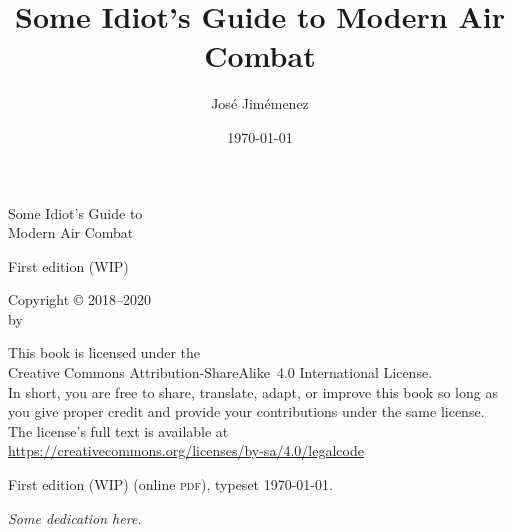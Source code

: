 \documentclass[fontsize=10bp, numbers=endperiod, draft=true]{scrbook}
\title{Some Idiot's Guide to Modern Air Combat}
\author{José Jimémenez}
\date{\today}
\makeatletter
\newcommand{\edition}{First edition \acronym{(WIP)}}
\newcommand{\acronym}[1]{\textsc{#1}}
\newcommand{\https}[1]{\url{https://#1}}
\let\runauthor\@author
\renewcommand{\cleardoublepage}{\clearpage}
\makeatother
\begin{document}
\fontsize{10bp}{13bp}\selectfont

\frontmatter
\setcounter{secnumdepth}{0}
\setlength\parindent{0pt}

{}
\vspace*{1in}
\begin{center}
\sffamily
\fontsize{0.25in}{0.3in}\selectfont
Some Idiot's Guide to \\
\fontsize{0.5in}{0.6in}\selectfont
Modern Air Combat

\normalsize
\vspace{1.5\baselineskip}
\edition
\vspace{2in}

\LARGE
\runauthor
\end{center}
\clearpage

{\raggedright%
\null
\vfill

Copyright © 2018--2020 \\
by \runauthor
\bigskip

This book is licensed under the \\
{Creative Commons Attribution-ShareAlike~4.0}
International License. \\
In short, you are free to share, translate, adapt, or improve this book
so long as you give proper credit and provide your contributions under
the same license. \\
The license's full text is available at \\
\https{creativecommons.org/licenses/by-sa/4.0/legalcode}

\vspace{0.5in}
\edition{} (online \acronym{pdf}), typeset \today.
} %
\clearpage

\vspace*{1in}
{\itshape%
Some dedication here.
}
\cleardoublepage

\tableofcontents

\mainmatter
\setlength\parindent{14bp}

\setcounter{page}{1} %
\cleardoublepage






\end{document}

